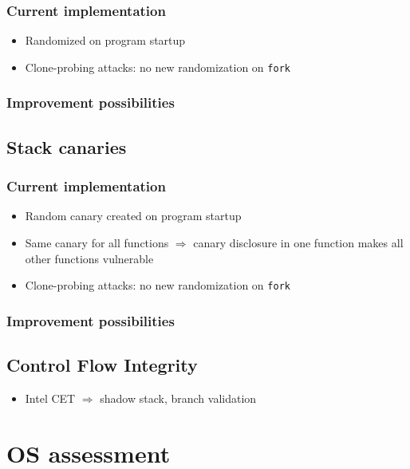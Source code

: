 \subsection{Current implementation}
\label{subsec:aslr-current}

\begin{itemize}
	\item{Randomized on program startup}
	\item{Clone-probing attacks: no new randomization on \texttt{fork}}
\end{itemize}

\subsection{Improvement possibilities}
\label{subsec:aslr-improvement}

\section{Stack canaries}
\label{sec:stack-canaries}

\subsection{Current implementation}
\label{subsec:canaries-current}

\begin{itemize}
	\item{Random canary created on program startup}
	\item{Same canary for all functions $\Rightarrow$ canary disclosure in one function makes all other functions vulnerable}
	\item{Clone-probing attacks: no new randomization on \texttt{fork}}
\end{itemize}

\subsection{Improvement possibilities}
\label{subsec:canaries-improvement}

\section{Control Flow Integrity}
\label{sec:cfi}

\begin{itemize}
	\item{Intel CET $\Rightarrow$ shadow stack, branch validation}
\end{itemize}

\chapter{OS assessment}
\label{chp:os-assessment}
